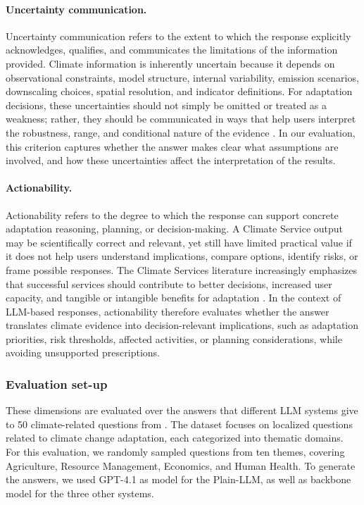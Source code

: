 \paragraph{Uncertainty communication.}
Uncertainty communication refers to the extent to which the response explicitly acknowledges, qualifies, and communicates the limitations of the information provided. Climate information is inherently uncertain because it depends on observational constraints, model structure, internal variability, emission scenarios, downscaling choices, spatial resolution, and indicator definitions. For adaptation decisions, these uncertainties should not simply be omitted or treated as a weakness; rather, they should be communicated in ways that help users interpret the robustness, range, and conditional nature of the evidence \citep{boon_defining_2024, boon_developing_2025}. In our evaluation, this criterion captures whether the answer makes clear what assumptions are involved, and how these uncertainties affect the interpretation of the results.

\paragraph{Actionability.}
Actionability refers to the degree to which the response can support concrete adaptation reasoning, planning, or decision-making. A Climate Service output may be scientifically correct and relevant, yet still have limited practical value if it does not help users understand implications, compare options, identify risks, or frame possible responses. The Climate Services literature increasingly emphasizes that successful services should contribute to better decisions, increased user capacity, and tangible or intangible benefits for adaptation \citep{lemos_narrowing_2012, vaughan_climate_2014, boon_successful_2022, boon_developing_2025}. In the context of LLM-based responses, actionability therefore evaluates whether the answer translates climate evidence into decision-relevant implications, such as adaptation priorities, risk thresholds, affected activities, or planning considerations, while avoiding unsupported prescriptions.

\subsubsection{Evaluation set-up} \label{evaluation-set-up}
These dimensions are evaluated over the answers that different LLM systems give to 50 climate-related questions from \citep{kuznetsov_climsight-gpt41-mini-climate-assesments_2025}. The dataset focuses on localized questions related to climate change adaptation, each categorized into thematic domains. For this evaluation, we randomly sampled questions from ten themes, covering Agriculture, Resource Management, Economics, and Human Health. To generate the answers, we used GPT-4.1 \citep{openai_gpt-41_2025} as model for the Plain-LLM, as well as backbone model for the three other systems. 

